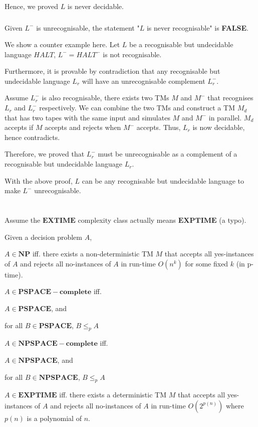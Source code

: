 \documentclass[12pt]{article}
\newcommand{\SubItem}[1]{
    {\setlength\itemindent{15pt} \item[-] #1}
}
\begin{document}
Hence, we proved $L$ is never decidable.

\subsubsection{}
Given $L^-$ is unrecognisable, the statement "$L$ is never recognisable" is \textbf{FALSE}.

We show a counter example here. Let $L$ be a recognisable but undecidable language $HALT$, $L^- = HALT^-$ is not recognisable.

Furthermore, it is provable by contradiction that any recognisable but undecidable language $L_r$ will have an unrecognisable complement $L_r^-$. 

Assume $L_r^-$ is also recognisable, there exists two TMs $M$ and $M^-$ that recognises $L_r$ and $L_r^-$ respectively. We can combine the two TMs and construct a TM $M_d$ that has two tapes with the same input and simulates $M$ and $M^-$ in parallel. $M_d$ accepts if $M$ accepts and rejects when $M^-$ accepts. Thus, $L_r$ is now decidable, hence contradicts. 

Therefore, we proved that $L_r^-$ must be unrecognisable as a complement of a recognisable but undecidable language $L_r$.

With the above proof, $L$ can be any recognisable but undecidable language to make $L^-$ unrecognisable.

\section{}

\subsection{}
Assume the $\pmb{EXTIME}$ complexity class actually means $\pmb{EXPTIME}$ (a typo).

Given a decision problem $A$,

\begin{itemize}
    \item $A \in \pmb{NP}$ iff. there exists a non-deterministic TM $M$ that accepts all yes-instances of $A$ and rejects all no-instances of $A$ in run-time $O(n^k)$ for some fixed $k$ (in p-time).
    \item $A \in \pmb{PSPACE-complete}$ iff.
    \SubItem{$A \in \pmb{PSPACE}$, and} 
    \SubItem{for all $B \in \pmb{PSPACE}$, $B \leq_p A$}
    \item $A \in \pmb{NPSPACE-complete}$ iff.
    \SubItem{$A \in \pmb{NPSPACE}$, and} 
    \SubItem{for all $B \in \pmb{NPSPACE}$, $B \leq_p A$}
    \item $A \in \pmb{EXPTIME}$ iff. there exists a deterministic TM $M$ that accepts all yes-instances of $A$ and rejects all no-instances of $A$ in run-time $O(2^{p(n)})$ where $p(n)$ is a polynomial of $n$. 
\end{itemize}
\end{document}
